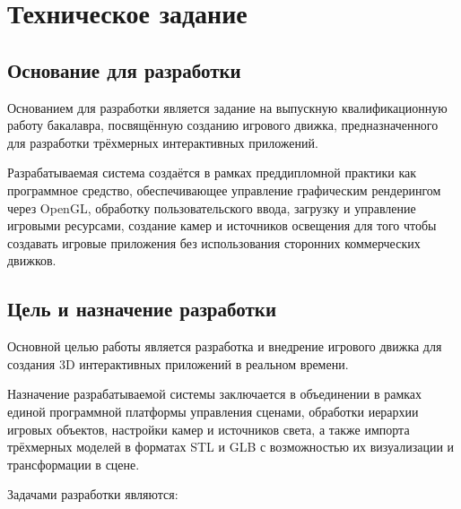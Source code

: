 
\section{Техническое задание}
\subsection{Основание для разработки}
Основанием для разработки является задание на выпускную квалификационную работу бакалавра, посвящённую созданию игрового движка, предназначенного для разработки трёхмерных интерактивных приложений.

Разрабатываемая система создаётся в рамках преддипломной практики как программное средство, обеспечивающее управление графическим рендерингом через OpenGL, обработку пользовательского ввода, загрузку и управление игровыми ресурсами, создание камер и источников освещения для того чтобы создавать игровые приложения без использования сторонних коммерческих движков.

\subsection{Цель и назначение разработки}
Основной целью работы является разработка и внедрение игрового движка для создания 3D интерактивных приложений в реальном времени.

Назначение разрабатываемой системы заключается в объединении в рамках единой программной платформы управления сценами, обработки иерархии игровых объектов, настройки камер и источников света, а также импорта трёхмерных моделей в форматах STL и GLB с возможностью их визуализации и трансформации в сцене.

Задачами разработки являются:


